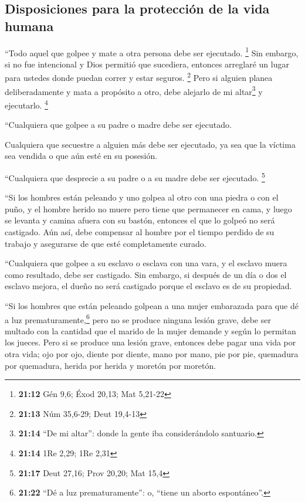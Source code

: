 \hypertarget{disposiciones-para-la-protecciuxf3n-de-la-vida-humana}{%
\subsection{Disposiciones para la protección de la vida
humana}\label{disposiciones-para-la-protecciuxf3n-de-la-vida-humana}}

 ``Todo aquel que golpee y mate a otra persona debe ser
ejecutado. \footnote{\textbf{21:12} Gén 9,6; Éxod 20,13; Mat 5,21-22}
 Sin embargo, si no fue intencional y Dios permitió que
sucediera, entonces arreglaré un lugar para ustedes donde puedan correr
y estar seguros. \footnote{\textbf{21:13} Núm 35,6-29; Deut 19,4-13}
 Pero si alguien planea deliberadamente y mata a
propósito a otro, debe alejarlo de mi altar\footnote{\textbf{21:14} ``De
  mi altar'': donde la gente iba considerándolo santuario.} y
ejecutarlo. \footnote{\textbf{21:14} 1Re 2,29; 1Re 2,31}

 ``Cualquiera que golpee a su padre o madre debe ser
ejecutado.

 Cualquiera que secuestre a alguien más debe ser
ejecutado, ya sea que la víctima sea vendida o que aún esté en su
posesión.

 ``Cualquiera que desprecie a su padre o a su madre debe
ser ejecutado. \footnote{\textbf{21:17} Deut 27,16; Prov 20,20; Mat 15,4}

 ``Si los hombres están peleando y uno golpea al otro con
una piedra o con el puño, y el hombre herido no muere pero tiene que
permanecer en cama,  y luego se levanta y camina afuera
con su bastón, entonces el que lo golpeó no será castigado. Aún así,
debe compensar al hombre por el tiempo perdido de su trabajo y
asegurarse de que esté completamente curado.

 ``Cualquiera que golpee a su esclavo o esclava con una
vara, y el esclavo muera como resultado, debe ser castigado.
 Sin embargo, si después de un día o dos el esclavo
mejora, el dueño no será castigado porque el esclavo es de su propiedad.

 ``Si los hombres que están peleando golpean a una mujer
embarazada para que dé a luz prematuramente,\footnote{\textbf{21:22}
  ``Dé a luz prematuramente'': o, ``tiene un aborto espontáneo''.} pero
no se produce ninguna lesión grave, debe ser multado con la cantidad que
el marido de la mujer demande y según lo permitan los jueces.
 Pero si se produce una lesión grave, entonces debe pagar
una vida por otra vida;  ojo por ojo, diente por diente,
mano por mano, pie por pie,  quemadura por quemadura,
herida por herida y moretón por moretón.

